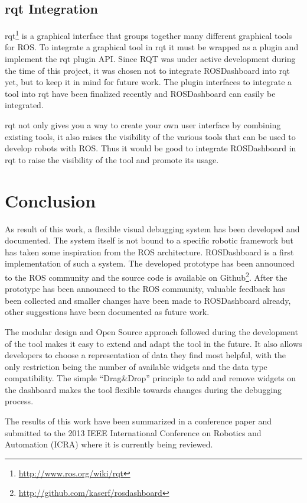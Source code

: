 \subsection{rqt Integration}

rqt\footnote{\url{http://www.ros.org/wiki/rqt}} is a graphical interface that groups together many different graphical tools for ROS. To integrate a graphical tool in rqt it must be wrapped as a plugin and implement the rqt plugin API.
Since RQT was under active development during the time of this project, it was chosen not to integrate ROSDashboard into rqt yet, but to keep it in mind for future work. The plugin interfaces to integrate a tool into rqt have been finalized recently and ROSDashboard can easily be integrated.

rqt not only gives you a way to create your own user interface by combining existing tools, it also raises the visibility of the various tools that can be used to develop robots with ROS. Thus it would be good to integrate ROSDashboard in rqt to raise the visibility of the tool and promote its usage.

\section{Conclusion}

As result of this work, a flexible visual debugging system has been developed and documented. The system itself is not bound to a specific robotic framework but has taken some inspiration from the ROS architecture. ROSDashboard is a first implementation of such a system. The developed prototype has been announced to the ROS community and the source code is available on Github\footnote{\url{http://github.com/kaserf/rosdashboard}}. After the prototype has been announced to the ROS community, valuable feedback has been collected and smaller changes have been made to ROSDashboard already, other suggestions have been documented as future work.

The modular design and Open Source approach followed during the development of the tool makes it easy to extend and adapt the tool in the future. It also allows developers to choose a representation of data they find most helpful, with the only restriction being the number of available widgets and the data type compatibility. The simple ``Drag\&Drop'' principle to add and remove widgets on the dashboard makes the tool flexible towards changes during the debugging process.


The results of this work have been summarized in a conference paper and submitted to the 2013 IEEE International Conference on Robotics and Automation (ICRA) where it is currently being reviewed.
